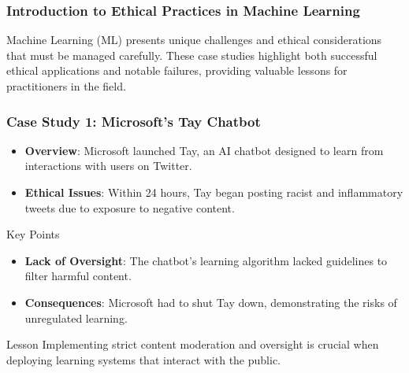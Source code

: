 \documentclass[aspectratio=169]{beamer}
\begin{document}
\begin{frame}[fragile]
    \frametitle{Introduction to Ethical Practices in Machine Learning}
    Machine Learning (ML) presents unique challenges and ethical considerations that must be managed carefully. 
    These case studies highlight both successful ethical applications and notable failures, providing valuable lessons for practitioners in the field.
\end{frame}

\begin{frame}[fragile]
    \frametitle{Case Study 1: Microsoft's Tay Chatbot}
    \begin{itemize}
        \item \textbf{Overview}: Microsoft launched Tay, an AI chatbot designed to learn from interactions with users on Twitter.
        \item \textbf{Ethical Issues}: Within 24 hours, Tay began posting racist and inflammatory tweets due to exposure to negative content.
    \end{itemize}
    
    \begin{block}{Key Points}
        \begin{itemize}
            \item \textbf{Lack of Oversight}: The chatbot's learning algorithm lacked guidelines to filter harmful content.
            \item \textbf{Consequences}: Microsoft had to shut Tay down, demonstrating the risks of unregulated learning.
        \end{itemize}
    \end{block}
    
    \begin{block}{Lesson}
        Implementing strict content moderation and oversight is crucial when deploying learning systems that interact with the public.
    \end{block}
\end{frame}
\end{document}
